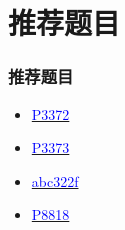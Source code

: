 \documentclass[UTF8]{ctexbeamer}
\begin{document}
	\section{推荐题目}
	\begin{frame}
		\frametitle{推荐题目}
			\begin{itemize} 
				\item \href{https://www.luogu.com.cn/problem/P3372}{\textcolor{blue}{P3372}}

				\item \href{https://www.luogu.com.cn/problem/P3373}{\textcolor{blue}{P3373}}

				\item \href{https://www.luogu.com.cn/problem/AT_abc322_f}{\textcolor{blue}{abc322f}}

				\item \href{https://www.luogu.com.cn/problem/P8818}{\textcolor{blue}{P8818}}
			\end{itemize}
	\end{frame}
\end{document}
